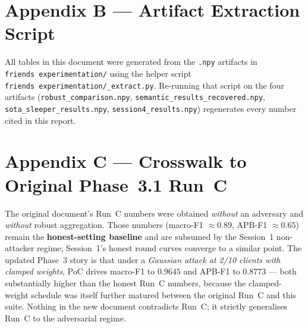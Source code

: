 \documentclass[11pt,a4paper]{article}
\begin{document}
\section{Appendix B --- Artifact Extraction Script}
\label{app:extract}

All tables in this document were generated from the \texttt{.npy}
artifacts in \texttt{friends\ experimentation/} using the helper script
\texttt{friends\ experimentation/\_extract.py}. Re-running that script on
the four artifacts (\texttt{robust\_comparison.npy},
\texttt{semantic\_results\_recovered.npy},
\texttt{sota\_sleeper\_results.npy}, \texttt{session4\_results.npy})
regenerates every number cited in this report.

\section{Appendix C --- Crosswalk to Original Phase~3.1 Run~C}

The original document's Run~C numbers were obtained \textit{without} an
adversary and \textit{without} robust aggregation. Those numbers
(macro-F1 $\approx 0.89$, APB-F1 $\approx 0.65$) remain the
\textbf{honest-setting baseline} and are subsumed by the Session~1
non-attacker regime; Session~1's honest round curves converge to a
similar point. The updated Phase~3 story is that under a
\textit{Gaussian attack at 2/10 clients with clamped weights}, PoC
drives macro-F1 to $0.9645$ and APB-F1 to $0.8773$ --- both
substantially higher than the honest Run~C numbers, because the
clamped-weight schedule was itself further matured between the
original Run~C and this suite. Nothing in the new document contradicts
Run~C; it strictly generalises Run~C to the adversarial regime.
\end{document}
